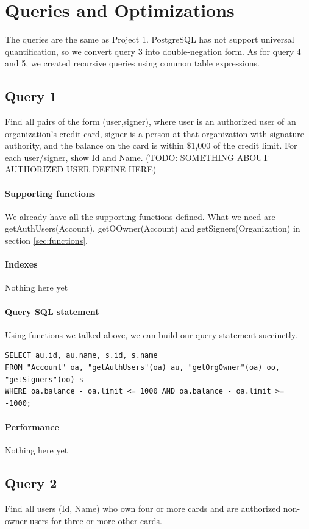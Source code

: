 \documentclass[11pt]{article}
\begin{document}
\section{Queries and Optimizations}
\label{sec:qando}
The queries are the same as Project 1. PostgreSQL has not support universal quantification, so we convert query 3 into double-negation form. As for query 4 and 5, we created recursive queries using common table expressions.

\subsection{Query 1}
Find all pairs of the form (user,signer), where user is an authorized user of an organization's credit card, signer is a person at that organization with signature authority, and the balance on the card is within \$1,000 of the credit limit. For each user/signer, show Id and Name. (TODO: SOMETHING ABOUT AUTHORIZED USER DEFINE HERE)

\paragraph{Supporting functions} We already have all the supporting functions defined. What we need are getAuthUsers(Account), getOOwner(Account) and getSigners(Organization) in section \ref{sec:functions}.

\paragraph{Indexes} Nothing here yet

\paragraph{Query SQL statement} Using functions we talked above, we can build our query statement succinctly.
\begin{verbatim}
SELECT au.id, au.name, s.id, s.name
FROM "Account" oa, "getAuthUsers"(oa) au, "getOrgOwner"(oa) oo, "getSigners"(oo) s
WHERE oa.balance - oa.limit <= 1000 AND oa.balance - oa.limit >= -1000;
\end{verbatim}

\paragraph{Performance} Nothing here yet

\subsection{Query 2}
Find all users (Id, Name) who own four or more cards and are authorized non-owner users for three or more other cards.
\end{document}
